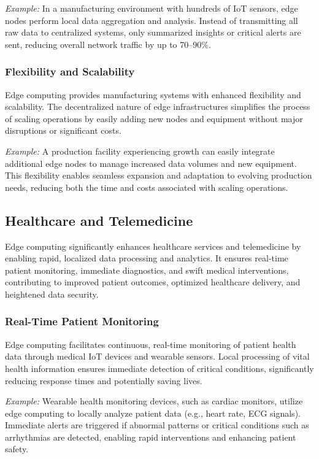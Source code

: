 \documentclass[runningheads]{llncs}
\begin{document}
\textit{Example:} In a manufacturing environment with hundreds of IoT sensors, edge nodes perform local data aggregation and analysis. Instead of transmitting all raw data to centralized systems, only summarized insights or critical alerts are sent, reducing overall network traffic by up to 70–90\%.

\subsubsection{Flexibility and Scalability}
Edge computing provides manufacturing systems with enhanced flexibility and scalability. The decentralized nature of edge infrastructures simplifies the process of scaling operations by easily adding new nodes and equipment without major disruptions or significant costs.

\textit{Example:} A production facility experiencing growth can easily integrate additional edge nodes to manage increased data volumes and new equipment. This flexibility enables seamless expansion and adaptation to evolving production needs, reducing both the time and costs associated with scaling operations.


\subsection{Healthcare and Telemedicine}

Edge computing significantly enhances healthcare services and telemedicine by enabling rapid, localized data processing and analytics. It ensures real-time patient monitoring, immediate diagnostics, and swift medical interventions, contributing to improved patient outcomes, optimized healthcare delivery, and heightened data security.

\subsubsection{Real-Time Patient Monitoring}
Edge computing facilitates continuous, real-time monitoring of patient health data through medical IoT devices and wearable sensors. Local processing of vital health information ensures immediate detection of critical conditions, significantly reducing response times and potentially saving lives.

\textit{Example:} Wearable health monitoring devices, such as cardiac monitors, utilize edge computing to locally analyze patient data (e.g., heart rate, ECG signals). Immediate alerts are triggered if abnormal patterns or critical conditions such as arrhythmias are detected, enabling rapid interventions and enhancing patient safety.
\end{document}
